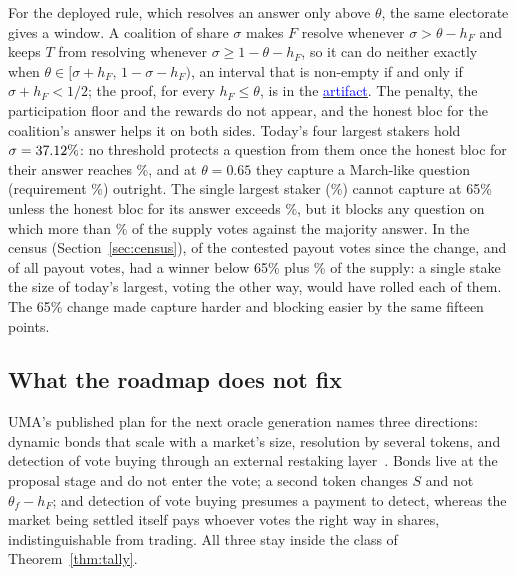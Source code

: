 \documentclass[conference,compsoc]{IEEEtran}
\newcommand{\artifactlink}[1]{\texorpdfstring{\href{https://github.com/submissionrepo/too-big-to-vote-on-artifact}{\textcolor{blue}{#1}}}{#1}}
\newcommand{\hF}{h_{F}}
\begin{document}
 For the deployed rule, which resolves an answer only above $\theta$, the same electorate gives a window. A coalition of share $\sigma$ makes $F$ resolve whenever $\sigma > \theta - \hF$ and keeps $T$ from resolving whenever $\sigma \ge 1 - \theta - \hF$, so it can do neither exactly when $\theta \in [\sigma + \hF,\, 1 - \sigma - \hF)$, an interval that is non-empty if and only if $\sigma + \hF < 1/2$; the proof, for every $\hF \le \theta$, is in the \artifactlink{artifact}. The penalty, the participation floor and the rewards do not appear, and the honest bloc for the coalition's answer helps it on both sides. Today's four largest stakers hold $\sigma = 37.12\%$: no threshold protects a question from them once the honest bloc for their answer reaches \windowEmptyAtTopFour\%, and at $\theta = 0.65$ they capture a March-like question (requirement \captureReqSixtyFiveMarch\%) outright. The single largest staker (\topOnePct\%) cannot capture at 65\% unless the honest bloc for its answer exceeds \topOneCaptureNeedsHF\%, but it blocks any question on which more than \topOneBlockNeedsHF\% of the supply votes against the majority answer. In the census (Section~\ref{sec:census}), \nEraBContestedBlockableByTopOne{} of the \nPayoutContestedEraB{} contested payout votes since the change, and \nEraBBlockableByTopOne{} of all \nPayoutVotesEraB{} payout votes, had a winner below 65\% plus \topOnePct\% of the supply: a single stake the size of today's largest, voting the other way, would have rolled each of them. The 65\% change made capture harder and blocking easier by the same fifteen points.

\subsection{What the roadmap does not fix}
 UMA's published plan for the next oracle generation names three directions: dynamic bonds that scale with a market's size, resolution by several tokens, and detection of vote buying through an external restaking layer~\cite{umanextgen2025}. Bonds live at the proposal stage and do not enter the vote; a second token changes $S$ and not $\theta_f - \hF$; and detection of vote buying presumes a payment to detect, whereas the market being settled itself pays whoever votes the right way in shares, indistinguishable from trading. All three stay inside the class of Theorem~\ref{thm:tally}.
\end{document}
